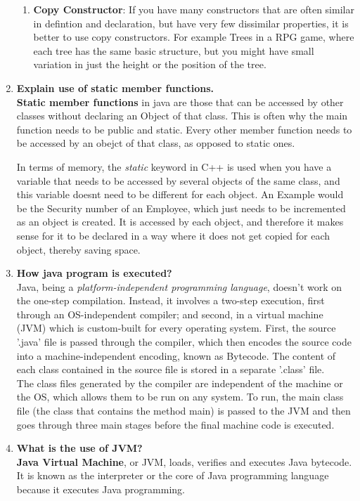 \documentclass[11pt]{article}
\begin{document}
\begin{enumerate}
\begin{enumerate}
		\item \textbf{Copy Constructor}: If you have many constructors that are often similar in defintion and declaration, but have very few dissimilar properties, it is better to use copy constructors. For example Trees in a RPG game, where each tree has the same basic structure, but you might have small variation in just the height or the position of the tree. 
	\end{enumerate}
	\item \textbf{ Explain use of static member functions.}\\
	
	\textbf{Static member functions} in java are those that can be accessed by other classes without declaring an Object of that class. This is often why the main function needs to be public and static. Every other member function needs to be accessed by an obejct of that class, as opposed to static ones. 

	In terms of memory, the \textit{static} keyword in C++ is used when you have a variable that needs to be accessed by several objects of the same class, and this variable doesnt need to be different for each object. An Example would be the Security number of an Employee, which just needs to be incremented as an object is created. It is accessed by each object, and therefore it makes sense for it to be declared in a way where it does not get copied for each object, thereby saving space. 
	\item \textbf{How java program is executed?}\\
	Java, being a \textit{platform-independent programming language}, doesn't work on the one-step compilation. Instead, it involves a two-step execution, first through an OS-independent compiler; and second, in a virtual machine (JVM) which is custom-built for every operating system. First, the source '.java' file is passed through the compiler, which then encodes the source code into a machine-independent encoding, known as Bytecode. The content of each class contained in the source file is stored in a separate '.class' file.\\
	
	The class files generated by the compiler are independent of the machine or the OS, which allows them to be run on any system. To run, the main class file (the class that contains the method main) is passed to the JVM and then goes through three main stages before the final machine code is executed.
	\item \textbf{What is the use of JVM?}\\
	\textbf{Java Virtual Machine}, or JVM, loads, verifies and executes Java bytecode. It is known as the interpreter or the core of Java programming language because it executes Java programming.


\end{enumerate}
\end{document}
